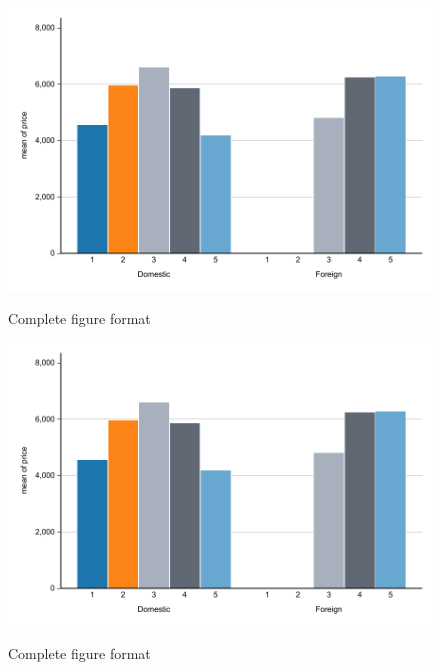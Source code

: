\documentclass{article}%
\begin{document}
\blindtext

\newpage

\blindtext

\begin{figure}[t]%
    \caption{Complete figure format}%
    \includegraphics[width=1\textwidth]{figure1.pdf}%
    \label{fig:placements_t}%
\end{figure}

\blindtext


\blindtext

\begin{figure}[!b]%
    \caption{Complete figure format}%
    \includegraphics[width=1\textwidth]{figure1.pdf}%
    \label{fig:placements_b}%
\end{figure}

\blindtext

\newpage

\blindtext
\end{document}

